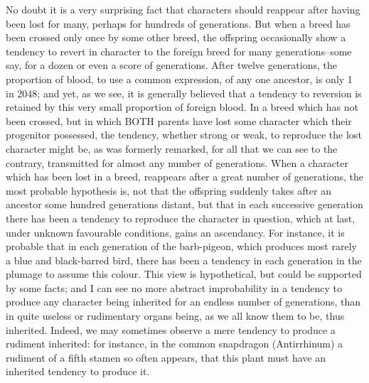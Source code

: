 No doubt it is a very surprising fact that characters should reappear after having been lost for many, perhaps for hundreds of generations. But when a breed has been crossed only once by some other breed, the offspring occasionally show a tendency to revert in character to the foreign breed for many generations--some say, for a dozen or even a score of generations. After twelve generations, the proportion of blood, to use a common expression, of any one ancestor, is only 1 in 2048; and yet, as we see, it is generally believed that a tendency to reversion is retained by this very small proportion of foreign blood. In a breed which has not been crossed, but in which BOTH parents have lost some character which their progenitor possessed, the tendency, whether strong or weak, to reproduce the lost character might be, as was formerly remarked, for all that we can see to the contrary, transmitted for almost any number of generations. When a character which has been lost in a breed, reappears after a great number of generations, the most probable hypothesis is, not that the offspring suddenly takes after an ancestor some hundred generations distant, but that in each successive generation there has been a tendency to reproduce the character in question, which at last, under unknown favourable conditions, gains an ascendancy. For instance, it is probable that in each generation of the barb-pigeon, which produces most rarely a blue and black-barred bird, there has been a tendency in each generation in the plumage to assume this colour. This view is hypothetical, but could be supported by some facts; and I can see no more abstract improbability in a tendency to produce any character being inherited for an endless number of generations, than in quite useless or rudimentary organs being, as we all know them to be, thus inherited. Indeed, we may sometimes observe a mere tendency to produce a rudiment inherited: for instance, in the common snapdragon (Antirrhinum) a rudiment of a fifth stamen so often appears, that this plant must have an inherited tendency to produce it.
